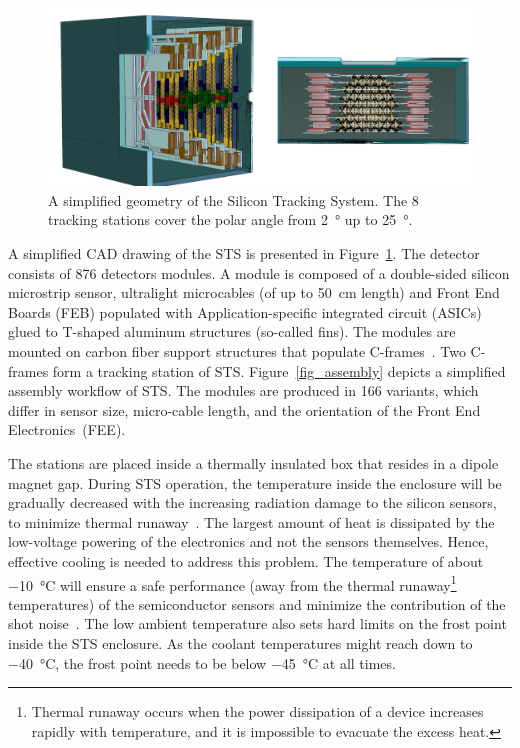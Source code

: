 \begin{figure}[!h]
\centering
\includegraphics[width=0.85\columnwidth]{Chapter2/images/STS.png}
\caption{A simplified geometry of the Silicon Tracking System. The 8 tracking stations cover the polar angle from \SI{2}{\degree} up to \SI{25}{\degree}.}
\label{fig_STS}
\end{figure}
A simplified CAD drawing of the \gls{STS} is presented in Figure~\ref{fig_STS}. The detector consists of 876 detectors modules. A module is composed of a double-sided silicon microstrip sensor, ultralight microcables (of up to \SI{50}{\centi\metre} length) and Front End Boards (\gls{FEB}) populated with Application-specific integrated circuit (\glspl{ASIC}) glued to T-shaped aluminum structures (so-called fins). The modules are mounted on carbon fiber support structures that populate C-frames~\cite{progress_report_2016}. Two C-frames form a tracking station of \gls{STS}.  Figure~\ref{fig_assembly} depicts a simplified assembly workflow of \gls{STS}.
The modules are produced in 166 variants, which differ in sensor size, micro-cable length, and the orientation of the Front End Electronics~(\gls{FEE}).  


The stations are placed inside a thermally insulated box that resides in a dipole magnet gap. During \gls{STS} operation, the temperature inside the enclosure will be gradually decreased with the increasing radiation damage to the silicon sensors, to minimize thermal runaway~\cite{Spieler}. The largest amount of heat is dissipated by the low-voltage powering of the electronics and not the sensors themselves. Hence, effective cooling is needed to address this problem.
The temperature of about \SI{-10}{\celsius} will ensure a safe performance (away from the thermal runaway\footnote{Thermal runaway occurs when the power dissipation of a device increases rapidly with temperature, and it is impossible to evacuate the excess heat.} temperatures) of the semiconductor sensors and minimize the contribution of the shot noise~\cite{Spieler}. The low ambient temperature also sets hard limits on the frost point inside the STS enclosure. As the coolant temperatures might reach down to \SI{-40}{\celsius}, the frost point needs to be below \SI{-45}{\celsius} at all times. 

